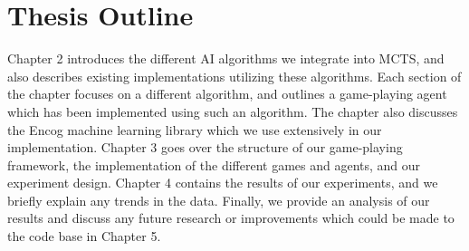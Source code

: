 \section{Thesis Outline}\label{sec:outline}
Chapter 2 introduces the different AI algorithms we integrate into MCTS, and also describes existing implementations utilizing these algorithms.  Each section of the chapter focuses on a different algorithm, and outlines a game-playing agent which has been implemented using such an algorithm.  The chapter also discusses the Encog machine learning library which we use extensively in our implementation.  Chapter 3 goes over the structure of our game-playing framework, the implementation of the different games and agents, and our experiment design.  Chapter 4 contains the results of our experiments, and we briefly explain any trends in the data.  Finally, we provide an analysis of our results and discuss any future research or improvements which could be made to the code base in Chapter 5.